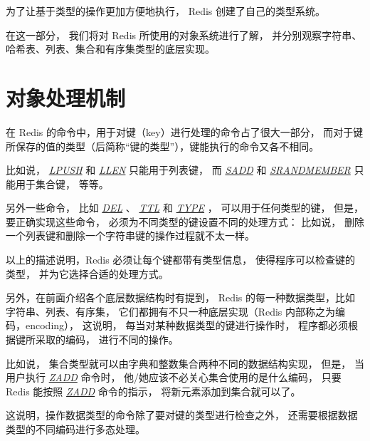 \documentclass[a4paper,11pt,english]{sphinxmanual}
\begin{document}
为了让基于类型的操作更加方便地执行，
Redis 创建了自己的类型系统。

在这一部分，
我们将对 Redis 所使用的对象系统进行了解，
并分别观察字符串、哈希表、列表、集合和有序集类型的底层实现。


\section{对象处理机制}
\label{datatype/object:object-chapter}\label{datatype/object::doc}\label{datatype/object:id1}
在 Redis 的命令中，用于对键（key）进行处理的命令占了很大一部分，
而对于键所保存的值的类型（后简称“键的类型”），键能执行的命令又各不相同。

比如说，
\href{http://redis.readthedocs.org/en/latest/list/lpush.html\#lpush}{\emph{LPUSH}} 和 \href{http://redis.readthedocs.org/en/latest/list/llen.html\#llen}{\emph{LLEN}} 只能用于列表键，
而 \href{http://redis.readthedocs.org/en/latest/set/sadd.html\#sadd}{\emph{SADD}} 和 \href{http://redis.readthedocs.org/en/latest/set/srandmember.html\#srandmember}{\emph{SRANDMEMBER}} 只能用于集合键，
等等。

另外一些命令，
比如 \href{http://redis.readthedocs.org/en/latest/key/del.html\#del}{\emph{DEL}} 、 \href{http://redis.readthedocs.org/en/latest/key/ttl.html\#ttl}{\emph{TTL}} 和 \href{http://redis.readthedocs.org/en/latest/key/type.html\#type}{\emph{TYPE}} ，
可以用于任何类型的键，
但是，
要正确实现这些命令，
必须为不同类型的键设置不同的处理方式：
比如说，
删除一个列表键和删除一个字符串键的操作过程就不太一样。

以上的描述说明，Redis 必须让每个键都带有类型信息，
使得程序可以检查键的类型，
并为它选择合适的处理方式。

另外，在前面介绍各个底层数据结构时有提到，
Redis 的每一种数据类型，比如字符串、列表、有序集，
它们都拥有不只一种底层实现（Redis 内部称之为编码，encoding），
这说明，
每当对某种数据类型的键进行操作时，
程序都必须根据键所采取的编码，
进行不同的操作。

比如说，
集合类型就可以由字典和整数集合两种不同的数据结构实现，
但是，
当用户执行 \href{http://redis.readthedocs.org/en/latest/sorted\_set/zadd.html\#zadd}{\emph{ZADD}} 命令时，
他/她应该不必关心集合使用的是什么编码，
只要 Redis 能按照 \href{http://redis.readthedocs.org/en/latest/sorted\_set/zadd.html\#zadd}{\emph{ZADD}} 命令的指示，
将新元素添加到集合就可以了。

这说明，操作数据类型的命令除了要对键的类型进行检查之外，
还需要根据数据类型的不同编码进行多态处理。
\end{document}

